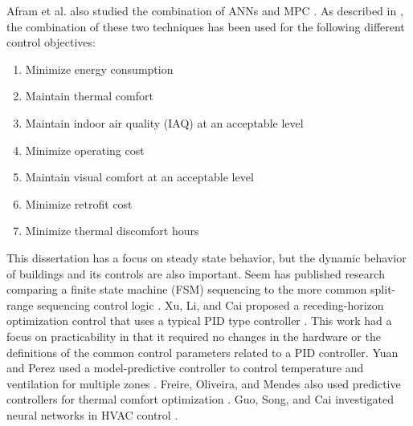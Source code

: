 Afram et al. also studied the combination of ANNs and MPC
\cite{Afram2017}. As described in \cite{Afram2017}, the combination of
these two techniques has been used for the following different control
objectives:

\begin{enumerate}
    \item Minimize energy consumption \cite{Ferreira2012, Huang2015a, Kusiak2011OptimizationOfAnHVACSystemWithAStrength, Kusiak2014MinimizationOfEnergyConsumptionInHVAC,WeiXiupeng2015, Garnier2015, Kim2016, LuLu2005HVACSystemOptimization, Ning2010Neuro-optimalSystem}
    \item Maintain thermal comfort \cite{Ferreira2012, Kusiak2011OptimizationOfAnHVACSystemWithAStrength, Kusiak2014MinimizationOfEnergyConsumptionInHVAC, WeiXiupeng2015, Garnier2015, Kim2016}
    \item Maintain indoor air quality (IAQ) at an acceptable level \cite{Kusiak2011MultiObjective}
    \item Minimize operating cost \cite{Garnier2015, Lee2015, Huang2015a, Ruano2015, Ruano2016}
    \item Maintain visual comfort at an acceptable level \cite{Kim2016}
    \item Minimize retrofit cost \cite{Asadi2014a}
    \item Minimize thermal discomfort hours \cite{Asadi2014a}
\end{enumerate}

This dissertation has a focus on steady state behavior, but the dynamic
behavior of buildings and its controls are also important. Seem has
published research comparing a finite state machine (FSM) sequencing to
the more common split-range sequencing control logic \cite{Seem1999}.
Xu, Li, and Cai proposed a receding-horizon optimization control that
uses a typical PID type controller \cite{XuMin2005}. This work had a
focus on practicability in that it required no changes in the hardware
or  the definitions of the common control parameters related to a PID
controller. Yuan and Perez used a model-predictive controller to control
temperature and ventilation for multiple zones
\cite{Yuan2006Multiple-zoneStrategy}. Freire, Oliveira, and Mendes also
used predictive controllers for thermal comfort optimization
\cite{Freire2008PredictiveSavings}.  Guo, Song, and Cai investigated
neural networks in HVAC control \cite{Guo2007}.
